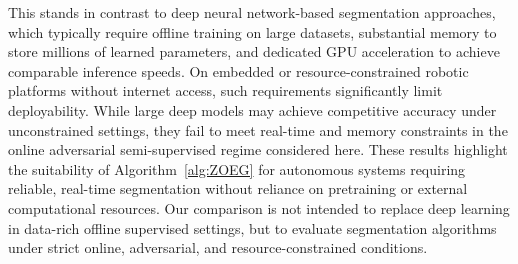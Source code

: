 \documentclass{article}
\theoremstyle{plain}
\theoremstyle{definition}
\theoremstyle{remark}
\begin{document}
This stands in contrast to deep neural network-based segmentation approaches, which typically require offline training on large datasets, substantial memory to store millions of learned parameters, and dedicated GPU acceleration to achieve comparable inference speeds. On embedded or resource-constrained robotic platforms without internet access, such requirements significantly limit deployability. While large deep models may achieve competitive accuracy under unconstrained settings, they fail to meet real-time and memory constraints in the online adversarial semi-supervised regime considered here. These results highlight the suitability of Algorithm~\ref{alg:ZOEG} for autonomous systems requiring reliable, real-time segmentation without reliance on pretraining or external computational resources. Our comparison is not intended to replace deep learning in data-rich offline supervised settings, but to evaluate segmentation algorithms under strict online, adversarial, and resource-constrained conditions. 
\end{document}
